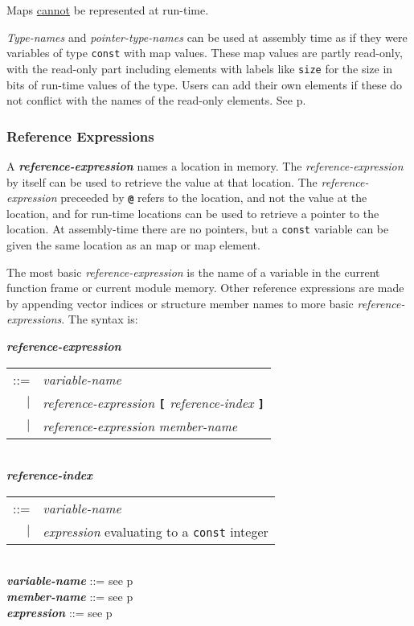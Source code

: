 \documentclass[12pt]{article}
\newcommand{\TT}[1]{{\tt \bfseries #1}}
\newcommand{\emkey}[1]{{\em \bfseries #1}}
\newcommand{\pagref}[1]{p\pageref{#1}}
\newenvironment{indpar}[1][0.3in]%
	{\begin{list}{}%
		     {\setlength{\itemsep}{0in}%
		      \setlength{\topsep}{0in}%
		      \setlength{\parsep}{1ex}%
		      \setlength{\labelwidth}{#1}%
		      \setlength{\leftmargin}{#1}%
		      \addtolength{\leftmargin}{\labelsep}}%
	 \item}%
	{\end{list}}
\begin{document}
Maps \underline{cannot} be represented at run-time.

{\em Type-names} and {\em pointer-type-names} can be used at
assembly time as if they were variables of type {\tt const}
with map values.  These map values are partly read-only,
with the read-only part including elements with labels like
{\tt size} for the size in bits of run-time values of the type.
Users can add their own elements if these do not conflict
with the names of the read-only elements.  See \pagref{TYPE-MAPS}.

\subsubsection{Reference Expressions}
\label{REFERENCE-EXPRESSIONS}

A \emkey{reference-expression} names a location in memory.
The {\em reference-expression} by itself can be used to retrieve
the value at that location.  The {\em reference-expression}
preceeded by \TT{@} refers to the location, and not the value
at the location, and for run-time locations can be used to retrieve
a pointer to the location.  At assembly-time there
are no pointers, but a {\tt const} variable can be given the
same location as an map or map element.

The most basic {\em reference-expression} is the name of a variable
in the current function frame or current module memory.  Other
reference expressions are made by appending vector indices or structure
member names to more basic {\em reference-expressions}.  The syntax
is:

\begin{indpar}
\emkey{reference-expression}
    \begin{tabular}[t]{rl}
    ::= & {\em variable-name} \\
    $|$ & {\em reference-expression} \TT{[} {\em reference-index} \TT{]} \\
    $|$ & {\em reference-expression} {\em member-name} \\
    \end{tabular}
\\[0.5ex]
\emkey{reference-index}\label{REFERENCE-INDEX}
    \begin{tabular}[t]{rl}
    ::= & {\em variable-name} \\
    $|$ & {\em expression} evaluating to a {\tt const} integer
    \end{tabular}
\\[0.5ex]
\emkey{variable-name} ::= see \pagref{VARIABLE-NAME}
\\[0.5ex]
\emkey{member-name} ::= see \pagref{MEMBER-NAME}
\\[0.5ex]
\emkey{expression} ::= see \pagref{EXPRESSION}
\end{indpar}
\end{document}

